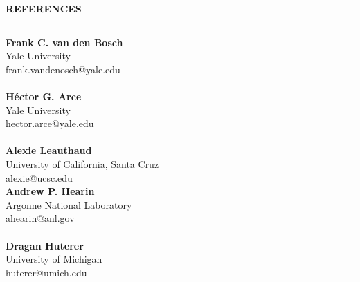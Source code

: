 \documentclass[12pt]{article}
\renewenvironment{section}[1]
  {
  \medskip
  {\color{yaleblue} \MakeUppercase{\bf #1}}
  \smallskip
  \hrule
  \medskip
  \begin{adjustwidth}{0.3cm}{}
  }
  {
  \end{adjustwidth}
  }
\newcommand{\entry}[3]{{\bf #1} \hfill {#2} \\ {#3}}
\begin{document}
\begin{section}{References}
    \begin{multicols*}{2}
    \entry{Frank C. van den Bosch}{}{Yale University\\frank.vandenosch@yale.edu} \\ \\
    \entry{H\'{e}ctor G. Arce}{}{Yale University\\hector.arce@yale.edu} \\ \\
    \entry{Alexie Leauthaud}{}{University of California, Santa Cruz\\alexie@ucsc.edu} \columnbreak \\
    \entry{Andrew P. Hearin}{}{Argonne National Laboratory\\ahearin@anl.gov} \\ \\
    \entry{Dragan Huterer}{}{University of Michigan\\huterer@umich.edu}
    \end{multicols*}
\end{section}
\end{document}
